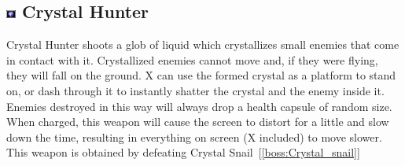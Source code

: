 \subsection{\includegraphics[width=12px, height=10px]{figures/X2/weapons/C_Hunter.png} Crystal Hunter}\label{Crystal_Hunter}
Crystal Hunter shoots a glob of liquid which crystallizes small enemies that come in contact with it. Crystallized enemies cannot move and, if they were flying, they will fall on the ground. X can use the formed crystal as a platform to stand on, or dash through it to instantly shatter the crystal and the enemy inside it. Enemies destroyed in this way will always drop a health capsule of random size. When charged, this weapon will cause the screen to distort for a little and slow down the time, resulting in everything on screen (X included) to move slower. This weapon is obtained by defeating Crystal Snail~[\ref{boss:Crystal_snail}]

